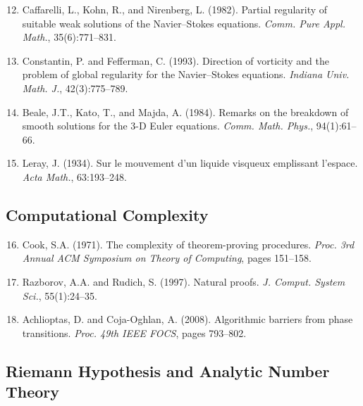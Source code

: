 \documentclass[12pt, openany]{book}
\theoremstyle{remark}
\begin{document}
\begin{enumerate}\setcounter{enumi}{11}

\item Caffarelli, L., Kohn, R., and Nirenberg, L. (1982). Partial regularity
      of suitable weak solutions of the Navier--Stokes equations. \emph{Comm.
      Pure Appl. Math.}, 35(6):771--831.

\item Constantin, P. and Fefferman, C. (1993). Direction of vorticity and the
      problem of global regularity for the Navier--Stokes equations. \emph{Indiana
      Univ. Math. J.}, 42(3):775--789.

\item Beale, J.T., Kato, T., and Majda, A. (1984). Remarks on the breakdown
      of smooth solutions for the 3-D Euler equations. \emph{Comm. Math. Phys.},
      94(1):61--66.

\item Leray, J. (1934). Sur le mouvement d'un liquide visqueux emplissant
      l'espace. \emph{Acta Math.}, 63:193--248.

\end{enumerate}

\subsection*{Computational Complexity}

\begin{enumerate}\setcounter{enumi}{15}

\item Cook, S.A. (1971). The complexity of theorem-proving procedures.
      \emph{Proc. 3rd Annual ACM Symposium on Theory of Computing}, pages 151--158.

\item Razborov, A.A. and Rudich, S. (1997). Natural proofs.
      \emph{J. Comput. System Sci.}, 55(1):24--35.

\item Achlioptas, D. and Coja-Oghlan, A. (2008). Algorithmic barriers from
      phase transitions. \emph{Proc. 49th IEEE FOCS}, pages 793--802.

\end{enumerate}

\subsection*{Riemann Hypothesis and Analytic Number Theory}
\end{document}
